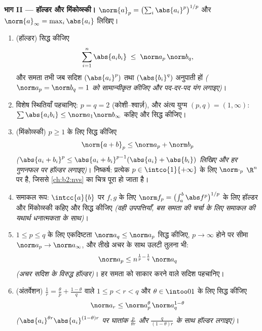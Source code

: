 \begin{problem}[{सप्ताहांत समस्या --- यंग, हॉल्डर, मिंकोव्स्की
और घात-माध्य शृंखला}]
\medskip
\noindent\textbf{भाग II --- हॉल्डर और मिंकोव्स्की।} $\norm{a}_p = \bigl(\sum_i \abs{a_i}^p\bigr)^{1/p}$ और $\norm{a}_\infty = \max_i\abs{a_i}$ लिखिए।
\begin{enumerate}[resume]
  \item (हॉल्डर) सिद्ध कीजिए
        \[
        \sum_{i=1}^{n}\abs{a_ib_i} \;\leq\;
        \norm a_p\,\norm b_q ,
        \]
        और समता तभी जब सदिश $(\abs{a_i}^p)$ तथा $(\abs{b_i}^q)$ अनुपाती हों \emph{($\norm a_p = \norm b_q = 1$ को
        सामान्यीकृत कीजिए और पद-दर-पद यंग लगाइए)}।
  \item विशेष स्थितियाँ पहचानिए: $p = q = 2$ (कोशी--श्वार्ज़), और अंत्य युग्म
        $(p, q) = (1,
        \infty)$: $\sum\abs{a_ib_i} \leq
        \norm a_1\norm b_\infty$ कहिए और सिद्ध कीजिए।
  \item (मिंकोव्स्की) $p \geq 1$ के लिए सिद्ध कीजिए
        \[
        \norm{a + b}_p \leq \norm a_p + \norm b_p
        \]
        \emph{($\abs{a_i + b_i}^p \leq \abs{a_i +
        b_i}^{p-1}(\abs{a_i} + \abs{b_i})$ लिखिए और हर गुणनफल पर हॉल्डर लगाइए)}। निष्कर्ष:
        प्रत्येक $p \in \intco{1}{+\infty}$ के लिए $\norm\cdot_p$ $\R^n$ पर  है, जिससे \cref{ch:b2:nvs} का चित्र
        पूरा हो जाता है।
  \item समाकल रूप: $\intcc{a}{b}$ पर  $f, g$ के लिए $\norm f_p = \bigl(\int_a^b\abs
        f^p\bigr)^{1/p}$ के लिए हॉल्डर और
        मिंकोव्स्की कहिए और सिद्ध कीजिए \emph{(वही उपपत्तियाँ, बस समता
        की चर्चा के लिए समाकल की यथार्थ धनात्मकता के साथ)}।
  \item $1
        \leq p \leq q$ के लिए एकदिष्टता $\norm a_q \leq \norm a_p$ सिद्ध कीजिए, $p \to \infty$ होने पर सीमा $\norm a_p \to
        \norm a_\infty$,
        और तीखे अचर के साथ उलटी तुलना भी:
        \[
        \norm a_p \leq n^{\frac1p - \frac1q}\,\norm a_q
        \]
        \emph{(अचर सदिश के विरुद्ध हॉल्डर)}। हर समता को साकार करने वाले
        सदिश पहचानिए।
  \item (अंतर्वेशन) $\frac1r = \frac\theta p +
        \frac{1-\theta}q$ वाले $1 \leq p < r < q$ और $\theta \in
        \intoo01$ के लिए सिद्ध कीजिए
        \[
        \norm a_r \leq \norm a_p^{\theta}\,
        \norm a_q^{1-\theta}
        \]
        \emph{($\abs{a_i}^{\theta
        r}\abs{a_i}^{(1-\theta)r}$ पर घातांक $\frac{p}{\theta
        r}$ और $\frac{q}{(1-\theta)r}$ के साथ हॉल्डर लगाइए)}।
\end{enumerate}


\end{problem}
